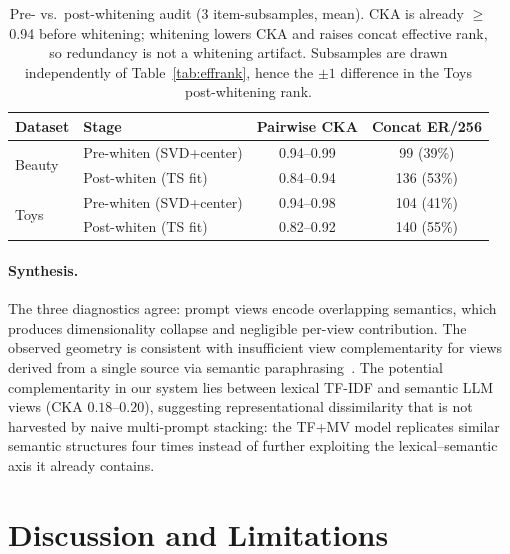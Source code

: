 \documentclass[sigconf,natbib=true,anonymous]{acmart}
\newcommand{\tfidf}{\textsc{TF-IDF}\xspace}
\newcommand{\llm}{\textsc{LLM}\xspace}
\newcommand{\tfmv}{\textsc{TF+MV}\xspace}
\begin{document}
\begin{table}[t]
\centering
\caption{%
Pre- vs.\ post-whitening audit (3 item-subsamples, mean).
CKA is already $\ge$0.94 before whitening; whitening lowers CKA and raises concat effective rank, so redundancy is not a whitening artifact.
Subsamples are drawn independently of Table~\ref{tab:effrank}, hence the $\pm 1$ difference in the Toys post-whitening rank.%
}
\label{tab:cka-prepost}
\small
\begin{tabular}{@{}llcc@{}}
\toprule
Dataset & Stage & Pairwise CKA & Concat ER/256 \\
\midrule
\multirow{2}{*}{Beauty}
 & Pre-whiten (SVD+center)  & 0.94--0.99 & 99 (39\%) \\
 & Post-whiten (TS fit)     & 0.84--0.94 & 136 (53\%) \\
\midrule
\multirow{2}{*}{Toys}
 & Pre-whiten (SVD+center)  & 0.94--0.98 & 104 (41\%) \\
 & Post-whiten (TS fit)     & 0.82--0.92 & 140 (55\%) \\
\bottomrule
\end{tabular}
\end{table}

\paragraph{Synthesis.}
The three diagnostics agree: prompt views encode overlapping semantics, which produces dimensionality collapse and negligible per-view contribution.
The observed geometry is consistent with insufficient view complementarity for views derived from a single source via semantic paraphrasing~\cite{xu2013multiview}.
The potential complementarity in our system lies between lexical \tfidf and semantic \llm views (CKA $0.18$--$0.20$), suggesting representational dissimilarity that is not harvested by naive multi-prompt stacking: the \tfmv model replicates similar semantic structures four times instead of further exploiting the lexical--semantic axis it already contains.

\section{Discussion and Limitations}
\label{sec:discussion}
\end{document}
